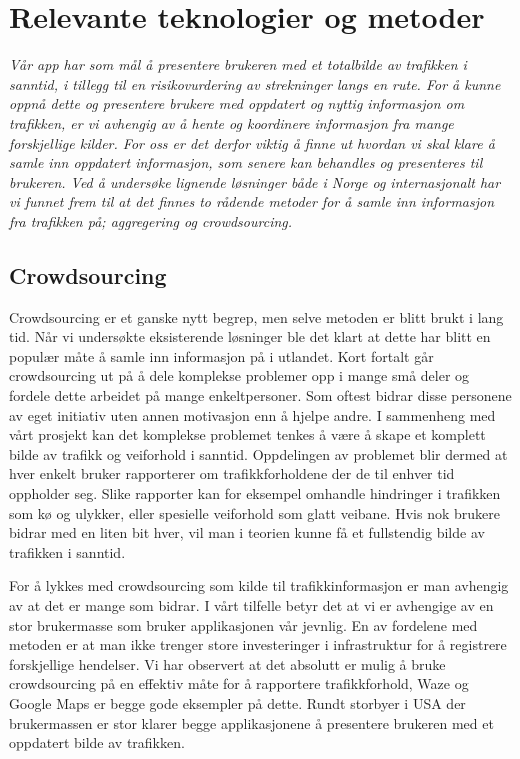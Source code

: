 \documentclass[a4paper,norsk,oneside]{book}
\begin{document}
\chapter{Relevante teknologier og metoder}
\label{cha:ResearchAndResults}

{\it Vår app har som mål å presentere brukeren med et totalbilde av trafikken i sanntid, i tillegg til en risikovurdering av strekninger langs en rute. For å kunne oppnå dette og presentere brukere med oppdatert og nyttig informasjon om trafikken, er vi avhengig av å hente og koordinere informasjon fra mange forskjellige kilder. For oss er det derfor viktig å finne ut hvordan vi skal klare å samle inn oppdatert informasjon, som senere kan behandles og presenteres til brukeren. Ved å undersøke lignende løsninger både i Norge og internasjonalt har vi funnet frem til at det finnes to rådende metoder for å samle inn informasjon fra trafikken på; aggregering og crowdsourcing. }

\section{Crowdsourcing}
\label{sec:crowdsourcing}

Crowdsourcing er et ganske nytt begrep, men selve metoden er blitt brukt i lang tid. Når vi undersøkte eksisterende løsninger ble det klart at dette har blitt en populær måte å samle inn informasjon på i utlandet. Kort fortalt går crowdsourcing ut på å dele komplekse problemer opp i mange små deler og fordele dette arbeidet på mange enkeltpersoner. Som oftest bidrar disse personene av eget initiativ uten annen motivasjon enn å hjelpe andre. I sammenheng med vårt prosjekt kan det komplekse problemet tenkes å være å skape et komplett bilde av trafikk og veiforhold i sanntid. Oppdelingen av problemet blir dermed at hver enkelt bruker rapporterer om trafikkforholdene der de til enhver tid oppholder seg. Slike rapporter kan for eksempel omhandle hindringer i trafikken som kø og ulykker, eller spesielle veiforhold som glatt veibane. Hvis nok brukere bidrar med en liten bit hver, vil man i teorien kunne få et fullstendig bilde av trafikken i sanntid.

For å lykkes med crowdsourcing som kilde til trafikkinformasjon er man avhengig av at det er mange som bidrar. I vårt tilfelle betyr det at vi er avhengige av en stor brukermasse som bruker applikasjonen vår jevnlig. En av fordelene med metoden er at man ikke trenger store investeringer i infrastruktur for å registrere forskjellige hendelser. Vi har observert at det absolutt er mulig å bruke crowdsourcing på en effektiv måte for å rapportere trafikkforhold, Waze og Google Maps er begge gode eksempler på dette. Rundt storbyer i USA der brukermassen er stor klarer begge applikasjonene å presentere brukeren med et oppdatert bilde av trafikken.
\end{document}
